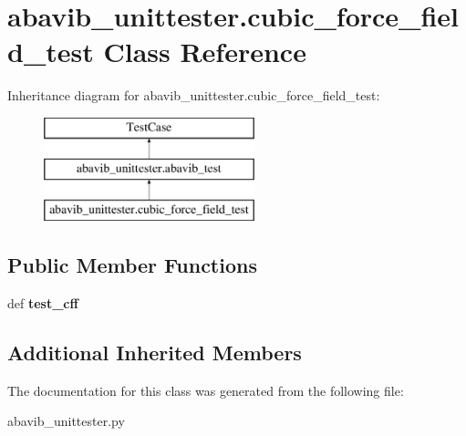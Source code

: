 \hypertarget{classabavib__unittester_1_1cubic__force__field__test}{\section{abavib\+\_\+unittester.\+cubic\+\_\+force\+\_\+field\+\_\+test Class Reference}
\label{classabavib__unittester_1_1cubic__force__field__test}
}
Inheritance diagram for abavib\+\_\+unittester.\+cubic\+\_\+force\+\_\+field\+\_\+test\+:\begin{figure}[H]
\begin{center}
\leavevmode
\includegraphics[height=3.000000cm]{classabavib__unittester_1_1cubic__force__field__test}
\end{center}
\end{figure}
\subsection*{Public Member Functions}
\begin{DoxyCompactItemize}
\item 
\hypertarget{classabavib__unittester_1_1cubic__force__field__test_a6d8a1ac55e92dab382535c172db37fe1}{def {\bfseries test\+\_\+cff}}\label{classabavib__unittester_1_1cubic__force__field__test_a6d8a1ac55e92dab382535c172db37fe1}

\end{DoxyCompactItemize}
\subsection*{Additional Inherited Members}


The documentation for this class was generated from the following file\+:\begin{DoxyCompactItemize}
\item 
abavib\+\_\+unittester.\+py\end{DoxyCompactItemize}
